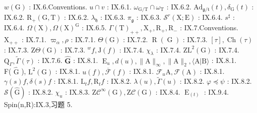 \(w(\mathrm{G})\) : IX.6.Conventions. \(u\cap v\) : IX.6.1. \(\omega_{\mathrm{G / T}}\cap \omega_{\mathrm{T}}\) : IX.6.2. \(\mathrm{Ad}_{\mathfrak{g} / \mathfrak{t}}(t),\delta_{\mathrm{G}}(t)\) : IX.6.2. \(\mathrm{R}_+(\mathrm{G},\mathrm{T})\) : IX.6.2. \(\lambda_{\mathfrak{h}}\) : IX.6.3. \(\pi_{\mathfrak{g}}\) : IX.6.3. \(\mathcal{S}^r (\mathrm{X};\mathrm{E})\) : IX.6.4. \(s^\sharp\) : IX.6.4. \(\Omega (\mathrm{X}),\Omega (\mathrm{X})^{\mathrm{G}}\) : IX.6.5. \(\Gamma (\mathrm{T})_{++},\mathrm{X}_{+},\mathrm{R}_{+},\mathrm{R}_{-}\) : IX.7.Conventions. \(\mathrm{X}_{++}\) : IX.7.1. \(\varpi_{\alpha},\rho\) : IX.7.1. \(\Theta (\mathrm{G})\) : IX.7.2. \(\operatorname {R}(\operatorname {G})\) : IX.7.3. \([\tau ],\operatorname {Ch}(\tau)\) : IX.7.3. \(\mathrm{Z}\Theta (\mathrm{G})\) : IX.7.3. \(^w f,\mathrm{J}(f)\) : IX.7.4. \(\chi_{\lambda}\) : IX.7.4. \(\mathrm{ZL}^2 (\mathrm{G})\) : IX.7.4. \(\mathrm{Q}_{\Gamma},\tilde{\Gamma} (\tau)\) : IX.7.6. \(\hat{\mathbf{G}}\) : IX.8.1. \(\operatorname {E}_u,d(u),\| \mathrm{A}\|_\infty ,\| \mathrm{A}\| _2,\langle \mathrm{A}|\mathrm{B}\rangle\) : IX.8.1.\\
F( \(\hat{\mathrm{G}}\) ), \(\mathrm{L}^2 (\mathrm{G})\) : IX.8.1. \(u(f),\overline{\mathcal{F}} (f)\) : IX.8.1. \(\mathcal{F}_u\mathrm{A},\mathcal{F}(\mathrm{A})\) : IX.8.1. \(\gamma (s)f,\delta (s)f\) : IX.8.1. \(\mathrm{L}_t f,\mathrm{R}_t f\) : IX.8.2. \(\lambda (u),\tilde{\Gamma} (u)\) : IX.8.2. \(\varphi \preccurlyeq \psi\) : IX.8.2. \(\mathcal{S}(\hat{\mathrm{G}})\) : IX.8.2. \(\chi_u\) : IX.8.3. \(\mathrm{Z}\mathcal{C}^{\infty}(\mathrm{G}),\mathrm{Z}\mathcal{C}(\mathrm{G})\) : IX.8.4. \(\operatorname {E}_{(t)}\) : IX.9.4.\\
Spin(n,R):IX.3,习题 5.

